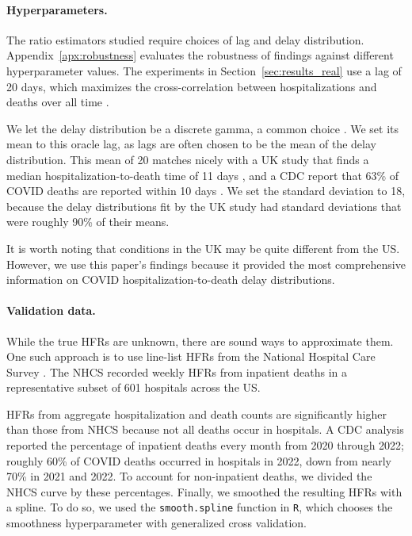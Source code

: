 \documentclass{article}
\newcommand{\djmcomment}[1]{{\color{teal}[DJM: #1]}}
\begin{document}
\paragraph{Hyperparameters.}
The ratio estimators studied require choices of lag and delay distribution. 
Appendix~\ref{apx:robustness} evaluates the
robustness of findings against different hyperparameter values. The experiments
in Section~\ref{sec:results_real} use a lag of 20 days, which maximizes the
cross-correlation between hospitalizations and deaths over all time
\citep{atlantic}. 

We let the delay distribution be a discrete gamma, a common
choice \citet{delay_distrs}. We set its mean to this oracle lag, as lags are often chosen to be the
mean of the delay distribution. This mean of 20 matches nicely with a UK study
that finds a median hospitalization-to-death time of 11 days \citep{UKdelay},
and a CDC report that 63\% of COVID deaths are reported within 10 days
\citep{cdc_deaths_demographic_geographic_2023}. 
We set the standard deviation to 18, because the delay distributions fit by the UK study had standard deviations that were roughly 90\% of their means. 

It is worth noting that conditions in the UK may be quite different from the US. However, we use this paper's findings because it provided the most comprehensive information on COVID hospitalization-to-death delay distributions.

\paragraph{Validation data.}
While the true HFRs are unknown, there are sound ways to approximate them. One such approach is to use line-list HFRs from the National Hospital Care Survey \citep{NHCS2023}. The NHCS recorded weekly HFRs from inpatient deaths in a representative subset of 601 hospitals across the US.

HFRs from aggregate hospitalization and death counts are significantly higher than those from NHCS because not all deaths occur in hospitals. A CDC analysis reported the percentage of inpatient deaths every month from 2020 through 2022; roughly 60\% of COVID deaths occurred in hospitals in 2022, down from nearly 70\% in 2021 and 2022. To account for non-inpatient deaths, we divided the NHCS curve by these percentages. Finally, we smoothed the resulting HFRs with a spline. To do so, we used the \texttt{smooth.spline} function in \texttt{R}, which chooses the smoothness hyperparameter with generalized cross validation. 
\end{document}
